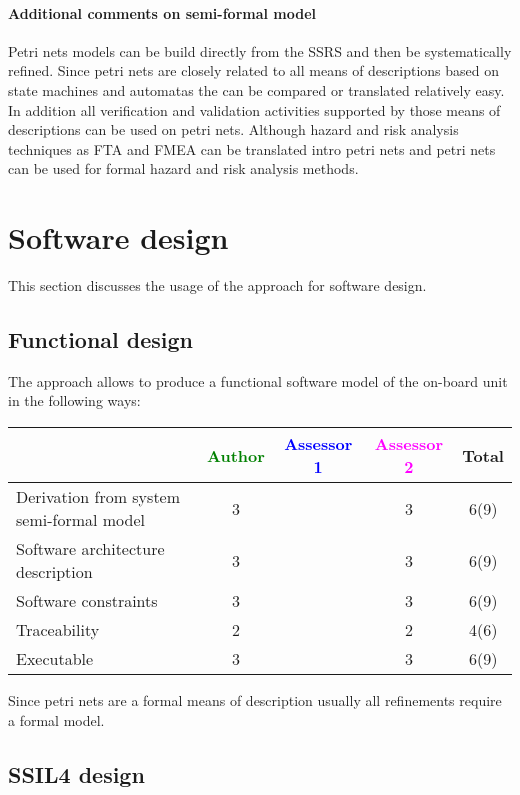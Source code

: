 \paragraph{Additional comments on semi-formal  model} 
Petri nets models can be build directly from the SSRS and then be systematically refined. 
Since petri nets are closely related to all means of descriptions based on state machines and automatas the can be compared or translated relatively easy. In addition all verification and validation activities supported by those means of descriptions can be used on petri nets. Although hazard and risk analysis techniques as FTA and FMEA can be translated intro petri nets and petri nets can be used for formal hazard and risk analysis methods.


\section{Software design}
This section discusses the usage of the approach for software design.

\subsection{Functional design}

The approach allows to  produce a functional software model of the on-board unit in the following ways:

\begin{tabular}{|l | c | c | c | c|}
\hline
& \textcolor{green}{Author} & \textcolor{blue}{Assessor 1} & \textcolor{magenta}{Assessor 2} & Total \\
\hline
Derivation from system semi-formal model  & 3     & & 3     &  6(9) \\
\hline 
Software architecture description  & 3     & & 3     &  6(9) \\
\hline
Software constraints  & 3     & & 3     &  6(9) \\
\hline
Traceability  & 2     & & 2     &  4(6) \\
\hline
Executable  & 3     & & 3     &  6(9) \\
\hline
\end{tabular}

Since petri nets are a formal means of description usually all refinements require a formal model.

\subsection{SSIL4 design}

